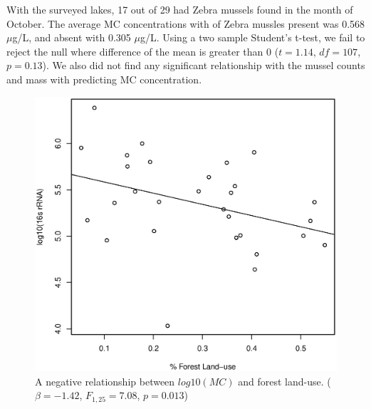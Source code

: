 With the surveyed lakes, 17 out of 29 had Zebra mussels found in the month of October. The average MC concentrations with  of Zebra mussles present was 0.568 $\mu$g/L, and absent with 0.305 $\mu$g/L. Using a two sample Student's t-test, we fail to reject the null where difference of the mean is greater than 0 ($t=1.14$, $df=107$, $p=0.13$). We also did not find any significant relationship with the mussel counts and mass with predicting MC concentration.


\begin{figure}[p]
	\includegraphics[width=\textwidth]{figures/forest}
	\caption{
A negative relationship between $log10(MC)$ and forest land-use. ($\beta=-1.42$, $F_{{1,25}}=7.08$, $p=0.013$)
}
	\label{fig:forest}
\end{figure}




